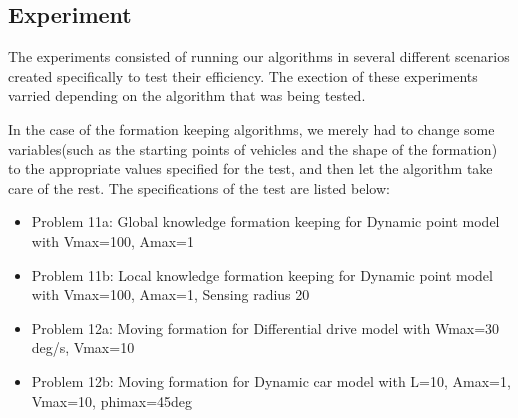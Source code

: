 \documentclass[a4paper,12pt]{article}
\begin{document}
\subsection{Experiment}

The experiments consisted of running our algorithms in several different scenarios created specifically to test their efficiency. The exection of these experiments varried depending on the algorithm that was being tested.

In the case of the formation keeping algorithms, we merely had to change some variables(such as the starting points of vehicles and the shape of the formation) to the appropriate values specified for the test, and then let the algorithm take care of the rest. The specifications of the test are listed below:
\begin{itemize}
\item Problem 11a: Global knowledge formation keeping for Dynamic point model with Vmax=100, Amax=1
\item Problem 11b: Local knowledge formation keeping for Dynamic point model with Vmax=100, Amax=1, Sensing radius 20
\item Problem 12a: Moving formation for Differential drive model with Wmax=30 deg/s, Vmax=10
\item Problem 12b: Moving formation for Dynamic car model with L=10, Amax=1, Vmax=10, phimax=45deg
\end{itemize}
\end{document}
